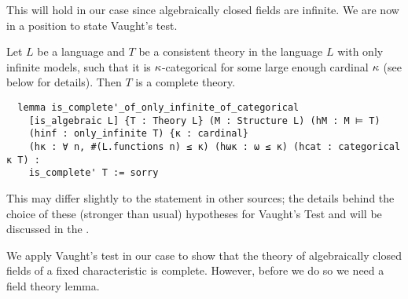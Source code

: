 This will hold in our case since algebraically closed fields are infinite.
We are now in a position to state Vaught's test.

\begin{prop}
  Let $L$ be a language and $T$ be a consistent theory in the language $L$
  with only infinite models, such that it is $\kappa$-categorical
  for some large enough cardinal $\kappa$ (see below for details).
  Then $T$ is a complete theory.

  \begin{lstlisting}
  lemma is_complete'_of_only_infinite_of_categorical
    [is_algebraic L] {T : Theory L} (M : Structure L) (hM : M ⊨ T)
    (hinf : only_infinite T) {κ : cardinal}
    (hκ : ∀ n, #(L.functions n) ≤ κ) (hωκ : ω ≤ κ) (hcat : categorical κ T) :
    is_complete' T := sorry
\end{lstlisting}
\end{prop}
  This may differ slightly to the statement in other sources;
  the details behind the choice of these (stronger than usual)
  hypotheses for Vaught's Test and
  will be discussed in the .

We apply Vaught's test in our case to show that the theory
of algebraically closed fields of a fixed characteristic is complete.
However, before we do so we need a field theory lemma.



